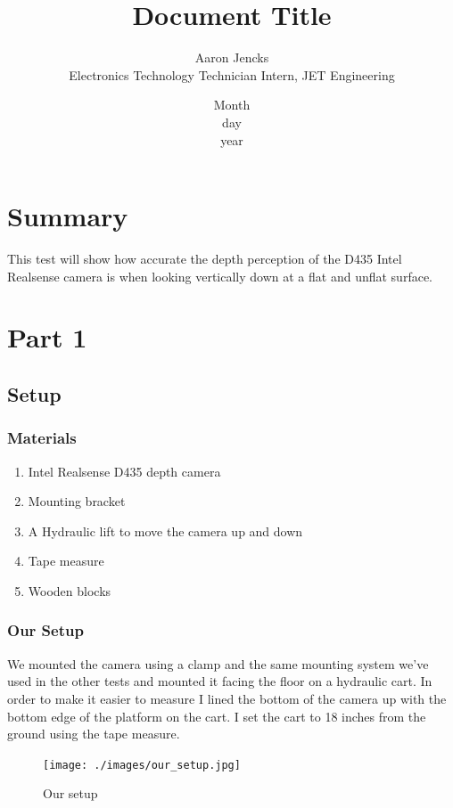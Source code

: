 \documentclass{article}
\title{Document Title}
\date{Month\\day\\year}
\author{Aaron Jencks\\Electronics Technology Technician Intern, JET Engineering}
\begin{document}
	\maketitle
	\newpage
	\tableofcontents
	\newpage

	

	\section{Summary}
		This test will show how accurate the depth perception of the D435 Intel Realsense camera is when looking vertically down at a flat and unflat surface.
	
	\section{Part 1}
		\subsection{Setup}
	
			\subsubsection{Materials}
	
				\begin{enumerate}
					\item Intel Realsense D435 depth camera
					\item Mounting bracket
					\item A Hydraulic lift to move the camera up and down
					\item Tape measure
					\item Wooden blocks
				\end{enumerate}
	
			\newpage
			\subsubsection{Our Setup}
				We mounted the camera using a clamp and the same mounting system we've used in the other tests and mounted it facing the floor on a hydraulic cart. In order to make it easier to measure I lined the bottom of the camera up with the bottom edge of the platform on the cart. I set the cart to 18 inches from the ground using the tape measure.
	
				
	
				\begin{figure}[h]
					\texttt{[image: ./images/our\_setup.jpg]}
					\centering
					\caption{Our setup}
					\label{fig:p1_setup}
				\end{figure}
	
\end{document}
